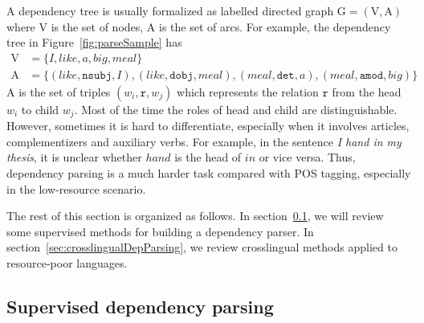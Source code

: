\documentclass[12pt,twoside,final,hidelinks]{ltthesis}
\theoremstyle{definition}
\begin{document}
A dependency tree is usually formalized as labelled directed graph $\text{G} = (\text{V},\text{A})$ where $\text{V}$ is the set of nodes, $\text{A}$ is the set of arcs. For example, the dependency tree in Figure~\ref{fig:parseSample} has 
\begin{align}
\text{V} &= \{I, like, a, big, meal\}\\
\text{A} &= \{(like, \texttt{nsubj}, I), (like, \texttt{dobj}, meal), (meal, \texttt{det}, a), (meal, \texttt{amod}, big)\} 
\end{align}
$\text{A}$ is the set of triples $(w_i,\texttt{r},w_j)$ which represents the relation $\texttt{r}$ from the head $w_i$ to child $w_j$. %
Most of the time the roles of head and child are distinguishable. However, sometimes it is hard to differentiate, especially when it involves articles, complementizers and auxiliary verbs. For example, in the sentence \textit{I hand in my thesis}, it is unclear whether $hand$ is the head of $in$ or vice versa. Thus, dependency parsing is a much harder task compared with POS tagging, especially in the low-resource scenario. 

The rest of this section is organized as follows. In section~\ref{sec:monolingualDep}, we will review some supervised methods for building a dependency parser. In section~\ref{sec:crosslingualDepParsing}, we review crosslingual methods applied to resource-poor languages. 

\subsection{Supervised dependency parsing}
\label{sec:monolingualDep}
\end{document}
